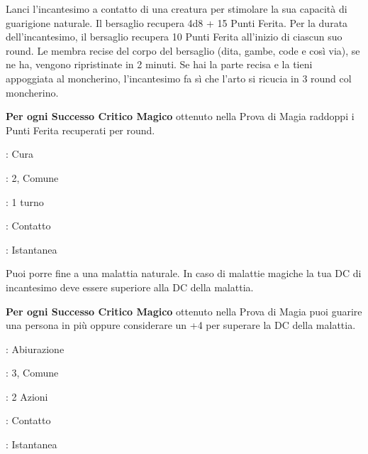 \begin{multicols}{2}
Lanci l'incantesimo a contatto di una creatura per stimolare la sua capacità di guarigione naturale. Il bersaglio recupera 4d8 + 15 Punti Ferita. Per la durata dell'incantesimo, il bersaglio recupera 10 Punti Ferita all'inizio di ciascun suo round. Le membra recise del corpo del bersaglio (dita, gambe, code e così via), se ne ha, vengono ripristinate in 2 minuti. Se hai la parte recisa e la tieni appoggiata al moncherino, l'incantesimo fa sì che l'arto si ricucia in 3 round col moncherino.

\textbf{Per ogni Successo Critico Magico} ottenuto nella Prova di Magia raddoppi i Punti Ferita recuperati per round.

\label{rimuovimalattie}\hypertarget{rimuovimalattie}{}
\noindent
\begin{description}[noitemsep, topsep=0pt, parsep=0pt, partopsep=0pt, leftmargin=0cm, labelwidth=1.3cm]
	\item[\textbf{Lista}]: Cura
	\item[\textbf{Livello}]: 2, Comune
	\item[\textbf{Lancio}]: 1 turno
	\item[\textbf{Gittata}]: Contatto
	\item[\textbf{Durata}]: Istantanea
\end{description}

Puoi porre fine a una malattia naturale. In caso di malattie magiche la tua DC di incantesimo deve essere superiore alla DC della malattia.

\textbf{Per ogni Successo Critico Magico} ottenuto nella Prova di Magia puoi guarire una persona in più oppure considerare un +4 per superare la DC della malattia.

\noindent\colorbox{OBSSgold!10}{
\begin{minipage}{0.95\linewidth}
\begin{description}[noitemsep, topsep=0pt, parsep=0pt, partopsep=0pt, leftmargin=0cm, labelwidth=1.3cm]
	\item[\textbf{Lista}]: Abiurazione
	\item[\textbf{Livello}]: 3, Comune
	\item[\textbf{Lancio}]: 2 Azioni
	\item[\textbf{Gittata}]: Contatto
	\item[\textbf{Durata}]: Istantanea
\end{description}
\end{minipage}}\smallskip


\end{multicols}
